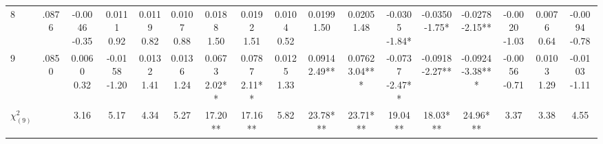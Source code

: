 \begin{landscape}
\begin{center}
{\begin{adjustbox}{max width=\textheight}
\begin{tabular}{lcccccccccccccccc}
8 & .0876 & \shortstack{-0.0046\\-0.35} & \shortstack{0.0111\\0.92} & \shortstack{0.0119\\0.82} & \shortstack{0.0107\\0.88} & \shortstack{0.0188\\1.50} & \shortstack{0.0192\\1.51} & \shortstack{0.0104\\0.52} & \shortstack{0.0199\\1.50} & \shortstack{0.0205\\1.48} & \shortstack{-0.0305\\-1.84*} & \shortstack{-0.0350\\-1.75*} & \shortstack{-0.0278\\-2.15**} & \shortstack{-0.0020\\-1.03} & \shortstack{0.0076\\0.64} & \shortstack{-0.0094\\-0.78} \\
9 & .0850 & \shortstack{0.0060\\0.32} & \shortstack{-0.0158\\-1.20} & \shortstack{0.0132\\1.41} & \shortstack{0.0136\\1.24} & \shortstack{0.0673\\2.02**} & \shortstack{0.0787\\2.11**} & \shortstack{0.0125\\1.33} & \shortstack{0.0914\\2.49**} & \shortstack{0.0762\\3.04***} & \shortstack{-0.0737\\-2.47**} & \shortstack{-0.0918\\-2.27**} & \shortstack{-0.0924\\-3.38***} & \shortstack{-0.0056\\-0.71} & \shortstack{0.0103\\1.29} & \shortstack{-0.0103\\-1.11} \\
$\chi^2_{(9)}$ &  & 3.16 & 5.17 & 4.34 & 5.27 & 17.20** & 17.16** & 5.82 & 23.78*** & 23.71*** & 19.04** & 18.03*** & 24.96*** & 3.37 & 3.38 & 4.55 \\
\bottomrule
\end{tabular}
\end{adjustbox}}
\end{center}
\end{landscape}

